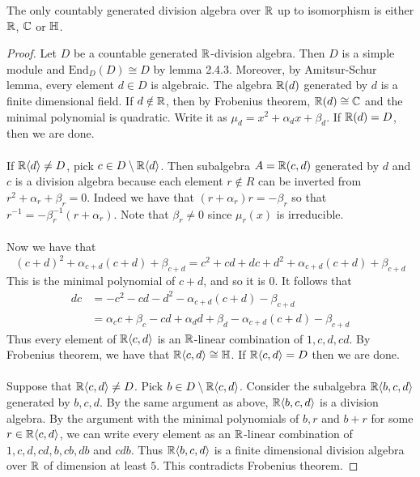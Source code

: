 \documentclass[a4paper]{article}
\begin{document}
\begin{thm}{}{} The only countably generated division algebra over $\mathbb{R}$ up to isomorphism is either $\mathbb{R}$, $\mathbb{C}$ or $\mathbb{H}$. \tcbline
\begin{proof}
Let $D$ be a countable generated $\mathbb{R}$-division algebra. Then $D$ is a simple module and $\text{End}_D(D)\cong D$ by lemma 2.4.3. Moreover, by Amitsur-Schur lemma, every element $d\in D$ is algebraic. The algebra $\mathbb{R}(d)$ generated by $d$ is a finite dimensional field. If $d\notin\mathbb{R}$, then by Frobenius theorem, $\mathbb{R}(d)\cong\mathbb{C}$ and the minimal polynomial is quadratic. Write it as $\mu_d=x^2+\alpha_dx+\beta_d$. If $\mathbb{R}(d)=D$, then we are done. \\~\\

If $\mathbb{R}\langle d\rangle\neq D$, pick $c\in D\setminus\mathbb{R}\langle d\rangle$. Then subalgebra $A=\mathbb{R}(c,d)$ generated by $d$ and $c$ is a division algebra because each element $r\notin R$ can be inverted from $r^2+\alpha_r+\beta_r=0$. Indeed we have that $(r+\alpha_r)r=-\beta_r$ so that $r^{-1}=-\beta_r^{-1}(r+\alpha_r)$. Note that $\beta_r\neq0$ since $\mu_r(x)$ is irreducible. \\~\\

Now we have that $$(c+d)^2+\alpha_{c+d}(c+d)+\beta_{c+d}=c^2+cd+dc+d^2+\alpha_{c+d}(c+d)+\beta_{c+d}$$ This is the minimal polynomial of $c+d$, and so it is $0$. It follows that 
\begin{align*}
dc&=-c^2-cd-d^2-\alpha_{c+d}(c+d)-\beta_{c+d}\\
&=\alpha_cc+\beta_c-cd+\alpha_dd+\beta_d-\alpha_{c+d}(c+d)-\beta_{c+d}
\end{align*}
Thus every element of $\mathbb{R}\langle c,d\rangle$ is an $\mathbb{R}$-linear combination of $1,c,d,cd$. By Frobenius theorem, we have that $\mathbb{R}\langle c,d\rangle\cong\mathbb{H}$. If $\mathbb{R}\langle c,d\rangle=D$ then we are done. \\~\\

Suppose that $\mathbb{R}\langle c,d\rangle\neq D$. Pick $b\in D\setminus\mathbb{R}\langle c,d\rangle$. Consider the subalgebra $\mathbb{R}\langle b,c,d\rangle$ generated by $b,c,d$. By the same argument as above, $\mathbb{R}\langle b,c,d\rangle$ is a division algebra. By the argument with the minimal polynomials of $b,r$ and $b+r$ for some $r\in\mathbb{R}\langle c,d\rangle$, we can write every element as an $\mathbb{R}$-linear combination of $1,c,d,cd,b,cb,db$ and $cdb$. Thus $\mathbb{R}\langle b,c,d\rangle$ is a finite dimensional division algebra over $\mathbb{R}$ of dimension at least $5$. This contradicts Frobenius theorem. 
\end{proof}
\end{thm}
\end{document}
